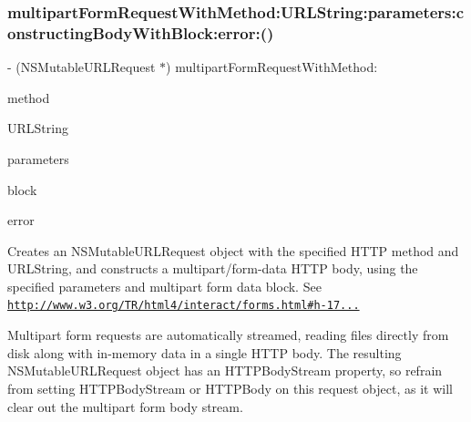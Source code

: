 \subsubsection{\texorpdfstring{multipart\+Form\+Request\+With\+Method\+:\+U\+R\+L\+String\+:parameters\+:constructing\+Body\+With\+Block\+:error\+:()}{multipartFormRequestWithMethod:URLString:parameters:constructingBodyWithBlock:error:()}\hspace{0.1cm}{\footnotesize\ttfamily [3/3]}}
{\footnotesize\ttfamily -\/ (N\+S\+Mutable\+U\+R\+L\+Request $\ast$) multipart\+Form\+Request\+With\+Method\+: \begin{DoxyParamCaption}\item[{(N\+S\+String $\ast$)}]{method }\item[{URLString:(N\+S\+String $\ast$)}]{U\+R\+L\+String }\item[{parameters:(nullable N\+S\+Dictionary $\ast$)}]{parameters }\item[{constructingBodyWithBlock:(nullable void($^\wedge$)(id$<$ \mbox{\hyperlink{protocol_a_f_multipart_form_data-p}{A\+F\+Multipart\+Form\+Data}} $>$ form\+Data))}]{block }\item[{error:(N\+S\+Error $\ast$\+\_\+\+\_\+nullable \+\_\+\+\_\+autoreleasing $\ast$)}]{error }\end{DoxyParamCaption}}

Creates an {\ttfamily N\+S\+Mutable\+U\+R\+L\+Request} object with the specified H\+T\+TP method and U\+R\+L\+String, and constructs a {\ttfamily multipart/form-\/data} H\+T\+TP body, using the specified parameters and multipart form data block. See \href{http://www.w3.org/TR/html4/interact/forms.html#h-17.13.4.2}{\tt http\+://www.\+w3.\+org/\+T\+R/html4/interact/forms.\+html\#h-\/17...}

Multipart form requests are automatically streamed, reading files directly from disk along with in-\/memory data in a single H\+T\+TP body. The resulting {\ttfamily N\+S\+Mutable\+U\+R\+L\+Request} object has an {\ttfamily H\+T\+T\+P\+Body\+Stream} property, so refrain from setting {\ttfamily H\+T\+T\+P\+Body\+Stream} or {\ttfamily H\+T\+T\+P\+Body} on this request object, as it will clear out the multipart form body stream.


